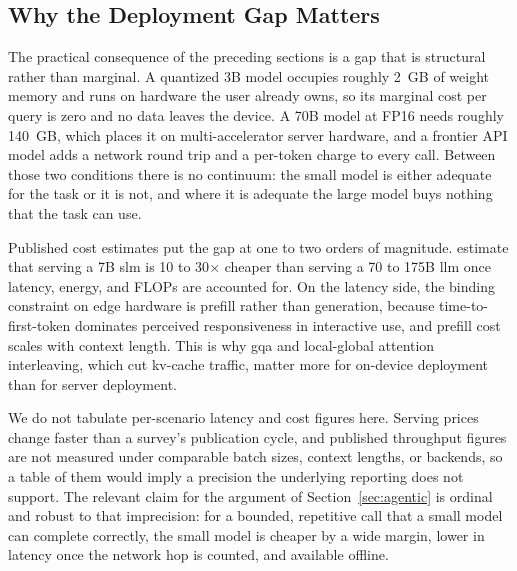 \subsection{Why the Deployment Gap Matters}
\label{subsec:deployment_latency}

The practical consequence of the preceding sections is a gap that is structural
rather than marginal. A quantized 3B model occupies roughly 2~GB of weight
memory and runs on hardware the user already owns, so its marginal cost per
query is zero and no data leaves the device. A 70B model at FP16 needs roughly
140~GB, which places it on multi-accelerator server hardware, and a frontier API
model adds a network round trip and a per-token charge to every call. Between
those two conditions there is no continuum: the small model is either adequate
for the task or it is not, and where it is adequate the large model buys nothing
that the task can use.

Published cost estimates put the gap at one to two orders of magnitude.
\citet{belcak2025slm_agentic} estimate that serving a 7B \gls{slm} is 10 to
30$\times$ cheaper than serving a 70 to 175B \gls{llm} once latency, energy, and
FLOPs are accounted for. On the latency side, the binding constraint on edge
hardware is prefill rather than generation, because time-to-first-token
dominates perceived responsiveness in interactive use, and prefill cost scales
with context length. This is why \gls{gqa} and local-global attention
interleaving, which cut \gls{kv}-cache traffic, matter more for on-device
deployment than for server deployment.

We do not tabulate per-scenario latency and cost figures here. Serving prices
change faster than a survey's publication cycle, and published throughput
figures are not measured under comparable batch sizes, context lengths, or
backends, so a table of them would imply a precision the underlying reporting
does not support. The relevant claim for the argument of
Section~\ref{sec:agentic} is ordinal and robust to that imprecision: for a
bounded, repetitive call that a small model can complete correctly, the small
model is cheaper by a wide margin, lower in latency once the network hop is
counted, and available offline.
